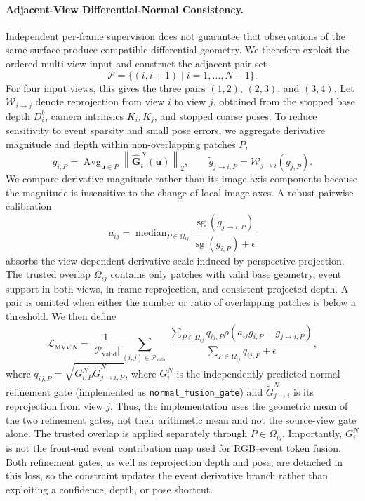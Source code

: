 \paragraph{Adjacent-View Differential-Normal Consistency.}
Independent per-frame supervision does not guarantee that observations of the
same surface produce compatible differential geometry. We therefore exploit
the ordered multi-view input and construct the adjacent pair set
\begin{equation}
    \mathcal P=\{(i,i+1)\mid i=1,\ldots,N-1\}.
\end{equation}
For four input views, this gives the three pairs $(1,2)$, $(2,3)$, and
$(3,4)$. Let $\mathcal W_{i\rightarrow j}$ denote reprojection from view $i$
to view $j$, obtained from the stopped base depth $D_i^b$, camera intrinsics
$K_i,K_j$, and stopped coarse poses. To reduce sensitivity to event sparsity
and small pose errors, we aggregate derivative magnitude and depth within
non-overlapping patches $P$,
\begin{equation}
    g_{i,P}=\operatorname{Avg}_{\bm u\in P}
    \left\|\widehat{\bm G}_i^N(\bm u)\right\|_2,
    \qquad
    \widetilde g_{j\rightarrow i,P}
    =\mathcal W_{j\rightarrow i}(g_{j,P}).
\end{equation}
We compare derivative magnitude rather than its image-axis components because
the magnitude is insensitive to the change of local image axes. A robust
pairwise calibration
\begin{equation}
    a_{ij}=\operatorname{median}_{P\in\Omega_{ij}}
    \frac{\operatorname{sg}(\widetilde g_{j\rightarrow i,P})}
         {\operatorname{sg}(g_{i,P})+\epsilon}
\end{equation}
absorbs the view-dependent derivative scale induced by perspective
projection. The trusted overlap $\Omega_{ij}$ contains only patches with
valid base geometry, event support in both views, in-frame reprojection, and
consistent projected depth. A pair is omitted when either the number or ratio
of overlapping patches is below a threshold. We then define
\begin{equation}
    \mathcal L_{\mathrm{MV}\nabla N}
    =\frac{1}{|\mathcal P_{\mathrm{valid}}|}
    \sum_{(i,j)\in\mathcal P_{\mathrm{valid}}}
    \frac{\sum_{P\in\Omega_{ij}}q_{ij,P}
    \rho\!\left(a_{ij}g_{i,P}-\widetilde g_{j\rightarrow i,P}\right)}
    {\sum_{P\in\Omega_{ij}}q_{ij,P}+\epsilon},
\end{equation}
where
$q_{ij,P}=\sqrt{G_{i,P}^{N}
\widetilde G_{j\rightarrow i,P}^{N}}$, where $G_i^{N}$ is the independently
predicted normal-refinement gate (implemented as \texttt{normal\_fusion\_gate})
and $\widetilde G_{j\rightarrow i}^{N}$ is its reprojection from view $j$.
Thus, the implementation uses the geometric mean of the two refinement gates,
not their arithmetic mean and not the source-view gate alone.  The trusted
overlap is applied separately through $P\in\Omega_{ij}$.  Importantly,
$G_i^{N}$ is not the front-end event contribution map used for RGB--event token
fusion.  Both refinement gates, as well as reprojection depth and pose, are
detached in this loss, so the constraint updates the event derivative branch
rather than exploiting a confidence, depth, or pose shortcut.

